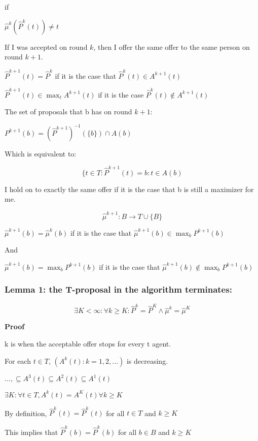 \documentclass[11pt]{article}
\begin{document}
if

\(\hat{\mu}^k(\hat{P}^k(t)) \ne t\)

If I was accepted on round \(k\), then I offer the same offer to the
same person on round \(k+1\).

\(\hat{P}^{k+1}(t) = \hat{P}^k\) if it is the case that
\(\hat{P}^k(t) \in A^{k+1}(t)\)

\(\hat{P}^{k+1}(t) \in \max_t A^{k+1}(t)\) if it is the case
\(\hat{P}^k(t) \notin A^{k+1}(t)\)

The set of proposals that b has on round \(k+1\):

\(P^{k+1}(b) = (\hat{P}^{k+1})^{-1} (\{b\}) \cap A(b)\)

Which is equivalent to:

\[\{t \in T: \hat{P}^{k+1}(t) = b: t \in A(b)\]

    I hold on to exactly the same offer if it is the case that b is still a
maximizer for me.

\[\hat{\mu}^{k+1}: B \rightarrow T \cup \{B\}\]

\(\hat{\mu}^{k+1}(b) = \hat{\mu}^{k}(b)\) if it is the case that
\(\hat{\mu}^{k+1}(b) \in \max_b P^{k+1}(b)\)

And

\(\hat{\mu}^{k+1}(b) = \max_b P^{k+1}(b)\) if it is the case that
\(\hat{\mu}^{k+1}(b) \notin \max_b P^{k+1}(b)\)

    \subsubsection{Lemma 1: the T-proposal in the algorithm
terminates:}\label{lemma-1-the-t-proposal-in-the-algorithm-terminates}

\[\exists K < \infty: \forall k \ge K: \hat{P}^k = \hat{P}^K \land \hat{\mu}^k = \hat{\mu}^K\]

    \textbf{Proof}

k is when the acceptable offer stops for every t agent.

For each \(t \in T\), \((A^k(t): k = 1,2,...)\) is decreasing.

\(..., \subseteq A^3(t) \subseteq A^2(t) \subseteq A^1(t)\)

\(\exists K: \forall t \in T, A^k(t) = A^K(t) \forall k \ge K\)

By definition, \(\hat{P}^k(t) = \hat{P}^k(t)\) for all \(t \in T\) and
\(k \ge K\)

This implies that \(\hat{P}^k(b) = \hat{P}^k(b)\) for all \(b \in B\)
and \(k \ge K\)
\end{document}
